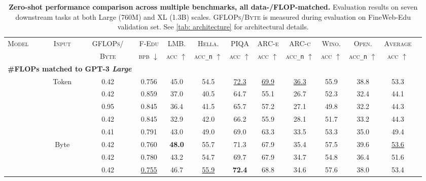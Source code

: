 \documentclass{article}
\newcommand{\best}[1]{\textbf{#1}}
\newcommand{\second}[1]{\underline{#1}}
\theoremstyle{plain}
\theoremstyle{remark}
\begin{document}
\begin{table}[t!]
\caption{
\textbf{Zero-shot performance comparison across multiple benchmarks, all data-/FLOP-matched.}
Evaluation results on seven downstream tasks at both Large (760M) and XL (1.3B) scales.
\textsc{GFLOPs/Byte} is measured during evaluation on FineWeb-Edu validation set.
See \cref{tab: architecture} for architectural details.
}
\centering
\small
\resizebox{\linewidth}{!}
{ 
\begin{tabular}{lcccccccccccc} 
\toprule
\multirow{2}{*}{\textsc{Model}} & \multirow{2}{*}{\textsc{Input}} & \textsc{GFLOPs/} & \textsc{F-Edu} & \textsc{LMB.} & \textsc{Hella.} & \textsc{PIQA} & \textsc{ARC-e} & \textsc{ARC-c} & \textsc{Wino.} & \textsc{Open.} & \textsc{Average} \\
& & \textsc{Byte} & \textsc{bpb} $\downarrow$ & \textsc{acc} $\uparrow$ & \textsc{acc}\texttt{\_n} $\uparrow$ & \textsc{acc} $\uparrow$ & \textsc{acc} $\uparrow$ & \textsc{acc}\texttt{\_n} $\uparrow$ & \textsc{acc} $\uparrow$ & \textsc{acc}\texttt{\_n} $\uparrow$ & \textsc{acc} $\uparrow$ \\
\midrule
\multicolumn{3}{l}{\quad \textbf{\#FLOPs matched to GPT-3 \textit{Large}}}\\
\cellcolor{Gray7!20}{Transformer} & Token & 0.42 & 0.756 & 45.0 & 54.5 & \second{72.3} & \second{69.9} & \second{36.3} & 55.9 & 38.8 & 53.3\\
\addlinespace[-0.15em]
\cmidrule{1-12}
\addlinespace[-0.25em]
\cellcolor{Grape7!10}{LlamaByte} & & 0.42 & 0.859 & 37.0 & 40.5 & 64.7 & 55.1 & 26.7 & 52.3 & 32.4 & 44.1\\
\cellcolor{Grape7!10}{LlamaByte (Global)} & & 0.95 & 0.845 & 36.4 & 41.5 & 65.7 & 57.2 & 27.1 & 49.8 & 32.2 & 44.3\\
\cellcolor{Blue7!10}{MambaByte} & & 0.42 & 0.845 & 32.9 & 42.0 & 66.2 & 55.9 & 28.1 & 51.7 & 33.2 & 44.3\\
\cellcolor{Cyan7!10}{SpaceByte} & & 0.41 & 0.791 & 43.0 & 49.0 & 69.0 & 63.3 & 33.5 & 53.3 & 35.0 & 49.4 \\
\cellcolor{Cyan7!10}{SpaceByte++} & Byte & 0.42 & 0.760 & \best{48.0} & 55.7 & 71.3 & 67.9 & 35.4 & 57.5 & 39.6 & \second{53.6}\\
\cellcolor{Green7!10}{H-Net (pool)} & & 0.42 & 0.780 & 43.2 & 54.7 & 69.7 & 67.9 & 34.7 & 54.8 & 36.4 & 51.6\\
\cellcolor{Green7!10}{H-Net (space)} & & 0.42 & \second{0.755} & 46.7 & \second{55.9} & \best{72.4} & 68.8 & 34.6 & 57.6 & 38.0 & 53.4\\

\end{tabular}}
\end{table}
\end{document}
